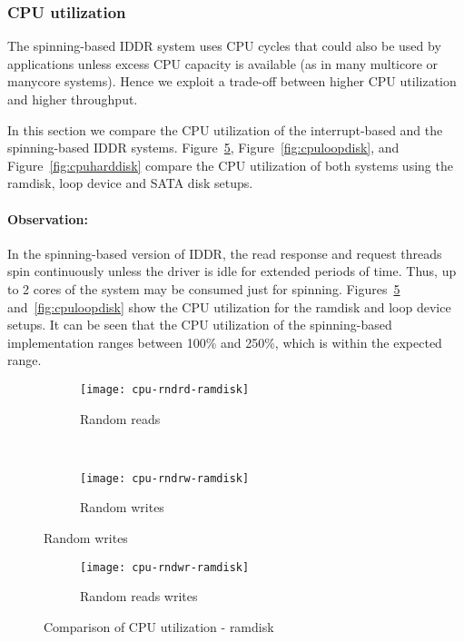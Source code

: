 \subsubsection*{CPU utilization}

The spinning-based IDDR system uses CPU cycles that could also be
used by applications unless excess CPU capacity is available (as in many
multicore or manycore systems). Hence we exploit a trade-off between higher 
CPU utilization and higher throughput.

In this section we compare the CPU utilization of the interrupt-based and
the spinning-based IDDR systems. Figure~\ref{fig:cpuramdisk}, Figure~\ref{fig:cpuloopdisk}, and
Figure~\ref{fig:cpuharddisk} compare the CPU utilization of both 
systems using the ramdisk, loop device and SATA disk setups.

\paragraph{Observation: }
In the spinning-based version of IDDR, the read response and request threads
spin continuously unless the driver is idle for extended periods of time.
Thus, up to 2 cores of the system may be consumed just for spinning.
Figures~\ref{fig:cpuramdisk} and~\ref{fig:cpuloopdisk} show the CPU
utilization for the ramdisk and loop device setups.
It can be seen that the CPU utilization of the spinning-based 
implementation ranges between 100\% and 250\%, which is within the
expected range.

\begin{figure}[!ht]
\centering
  \begin{subfigure}[b]{\textwidth}
  \texttt{[image: cpu-rndrd-ramdisk]}
  \caption{Random reads}
  \label{subfig:cpu-rndrd-ramdisk}
  \end{subfigure}\\
  \begin{subfigure}[b]{\textwidth}
  \texttt{[image: cpu-rndrw-ramdisk]}
  \caption{Random writes}
  \label{subfig:cpu-rndrw-ramdisk}
  \end{subfigure}
\end{figure}

\begin{figure}[H]
  \ContinuedFloat
  \begin{subfigure}[b]{\textwidth}
  \texttt{[image: cpu-rndwr-ramdisk]}
  \caption{Random reads writes}
  \label{subfig:cpu-rndwr-ramdisk}
  \end{subfigure}
\caption{Comparison of CPU utilization - ramdisk}\label{fig:cpuramdisk}
\end{figure}

